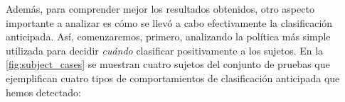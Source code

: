 Además, para comprender mejor los resultados obtenidos, otro aspecto importante a analizar es cómo  se llevó a cabo efectivamente la clasificación anticipada. 
Así, comenzaremos, primero, analizando la política más simple utilizada para decidir \emph{cuándo} clasificar positivamente a los sujetos. En la \autoref{fig:subject_cases} se muestran cuatro sujetos del conjunto de pruebas que ejemplifican cuatro tipos de comportamientos de clasificación anticipada que hemos detectado:


